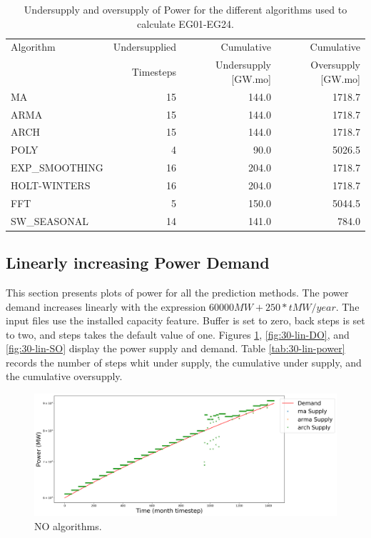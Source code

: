 \documentclass[11pt]{article}
\begin{document}
\begin{table}[!h]
	\centering
	\caption{Undersupply and oversupply of Power for the different algorithms used to calculate EG01-EG24.}
	\label{tab:30-power}
	\begin{tabularx}{\textwidth}{lRRR}
		\hline
		Algorithm & Undersupplied & Cumulative  & Cumulative \\
		& Timesteps     & Undersupply [GW.mo]  & Oversupply [GW.mo] \\ \hline
		MA        & 15 & 144.0 & 1718.7 \\ 
		ARMA      & 15 & 144.0 & 1718.7 \\ 
		ARCH      & 15 & 144.0 & 1718.7 \\ 
		POLY      & 4  & 90.0 & 5026.5 \\ 
		EXP\_SMOOTHING 	& 16 & 204.0 & 1718.7 \\ 
		HOLT-WINTERS  	& 16 & 204.0 & 1718.7 \\ 
		FFT       & 5 & 150.0 & 5044.5 \\ 
		SW\_SEASONAL    & 14 & 141.0 & 784.0 \\ \hline
	\end{tabularx}
\end{table}

\subsection{Linearly increasing Power Demand}

This section presents plots of power for all the prediction methods. The power demand increases linearly with the expression $60000 MW + 250*t MW/year$. The input files use the installed capacity feature. Buffer is set to zero, back steps is set to two, and steps takes the default value of one.
Figures \ref{fig:30-lin-NO}, \ref{fig:30-lin-DO}, and \ref{fig:30-lin-SO} display the power supply and demand.
Table \ref{tab:30-lin-power} records the number of steps whit under supply, the cumulative under supply, and the cumulative oversupply.

\begin{figure}[!h]
	\centering
	\includegraphics[width=\textwidth]{30-figures/lin-30-power-buffer01.png} 
	\hfill
	\caption{NO algorithms.}
	\label{fig:30-lin-NO}
\end{figure}
\end{document}
